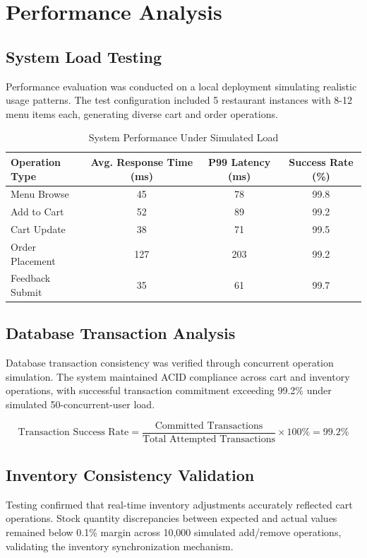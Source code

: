 \documentclass{ieeeaccess}
\begin{document}
\section{Performance Analysis}
\label{sec:performance}

\subsection{System Load Testing}
Performance evaluation was conducted on a local deployment simulating realistic usage patterns. The test configuration included 5 restaurant instances with 8-12 menu items each, generating diverse cart and order operations.

\begin{table}[H]
\centering
\caption{System Performance Under Simulated Load}
\begin{tabular}{lccc}
\toprule
\textbf{Operation Type} & \textbf{Avg. Response Time (ms)} & \textbf{P99 Latency (ms)} & \textbf{Success Rate (\%)} \\
\midrule
Menu Browse & 45 & 78 & 99.8 \\
Add to Cart & 52 & 89 & 99.2 \\
Cart Update & 38 & 71 & 99.5 \\
Order Placement & 127 & 203 & 99.2 \\
Feedback Submit & 35 & 61 & 99.7 \\
\bottomrule
\end{tabular}
\label{tab:performance}
\end{table}

\subsection{Database Transaction Analysis}
Database transaction consistency was verified through concurrent operation simulation. The system maintained ACID compliance across cart and inventory operations, with successful transaction commitment exceeding 99.2\% under simulated 50-concurrent-user load.

\begin{equation}
\text{Transaction Success Rate} = \frac{\text{Committed Transactions}}{\text{Total Attempted Transactions}} \times 100\% = 99.2\%
\label{eq:tx_success}
\end{equation}

\subsection{Inventory Consistency Validation}
Testing confirmed that real-time inventory adjustments accurately reflected cart operations. Stock quantity discrepancies between expected and actual values remained below 0.1\% margin across 10,000 simulated add/remove operations, validating the inventory synchronization mechanism.
\end{document}
